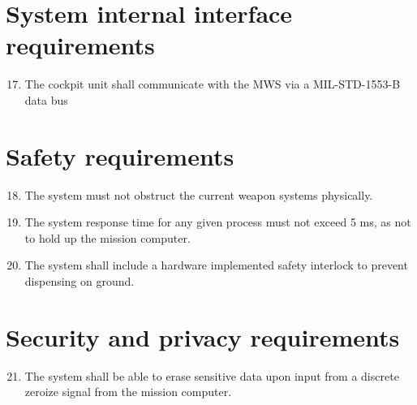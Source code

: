 \documentclass[Main]{subfiles}
\begin{document}
\section{System internal interface requirements}

\begin{enumerate}[{SR}-1]
\setcounter{enumi}{16}
\item The cockpit unit shall communicate with the MWS via a MIL-STD-1553-B data bus\label{SR-17}

\end{enumerate}


\section{Safety requirements}
\begin{enumerate}[{SR}-1.]
\setcounter{enumi}{17}
\item The system must not obstruct the current weapon systems physically.\label{SR-18}

\item The system response time for any given process must not exceed 5 ms, as not to hold up the mission computer.\label{SR-19}

\item The system shall include a hardware implemented safety interlock to prevent dispensing on ground.\label{SR-20}

\end{enumerate}


\section{Security and privacy requirements}

\begin{enumerate}[{SR}-1]
\setcounter{enumi}{20}
\item The system shall be able to erase sensitive data upon input from a discrete zeroize signal from the mission computer.\label{SR-21}

\end{enumerate}
\end{document}
